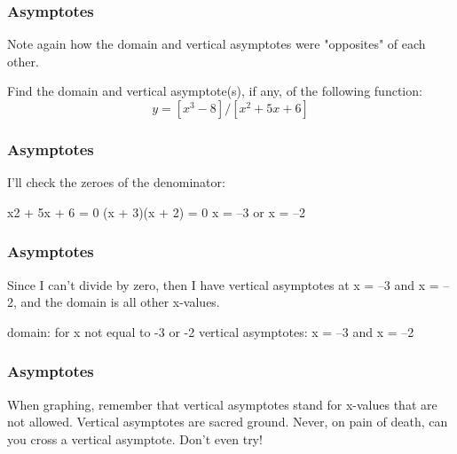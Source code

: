 \documentclass{beamer}
\begin{document}
\begin{frame}
	\frametitle{Asymptotes}
	\Large
Note again how the domain and vertical asymptotes were "opposites" of each other.

Find the domain and vertical asymptote(s), if any, of the following function:
\[y = [x^3 - 8] / [x^2 + 5x + 6]\]

\end{frame}
\begin{frame}
	\frametitle{Asymptotes}
	\Large
I'll check the zeroes of the denominator:

x2 + 5x + 6 = 0 
(x + 3)(x + 2) = 0 
x = –3 or x = –2
\end{frame}
\begin{frame}
	\frametitle{Asymptotes}
	\Large
Since I can't divide by zero, then I have vertical asymptotes at x = –3  and x = –2, and the domain is all other x-values.

domain:   for x not equal to -3 or -2 
vertical asymptotes:  x = –3   and x = –2
\end{frame}
\begin{frame}
	\frametitle{Asymptotes}
	\Large
When graphing, remember that vertical asymptotes stand for x-values that are not allowed. Vertical asymptotes are sacred ground. Never, on pain of death, can you cross a vertical asymptote. Don't even try!
\end{frame}
\end{document}
